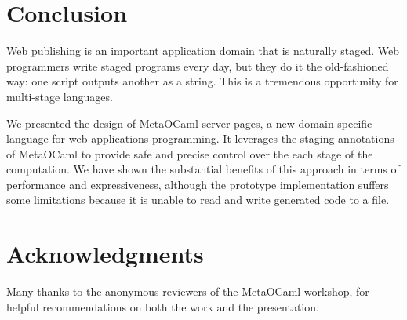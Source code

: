 \documentclass[preprint]{acm_proc_article-sp}
\def\MOC{MetaOCaml\xspace}
\begin{document}
\section{Conclusion}
\label{sec:concl}

Web publishing is an important application domain that is
naturally staged.  Web programmers write staged programs every
day, but they do it the old-fashioned way: one script outputs
another as a string.  This is a tremendous opportunity for
multi-stage languages.

We presented the design of \MOC server pages, a new
domain-specific language for web applications programming.  It
leverages the staging annotations of \MOC to provide safe and
precise control over the each stage of the computation.
We have shown the substantial benefits of this approach in terms
of performance and expressiveness, although the prototype
implementation suffers some limitations because it is unable to
read and write generated code to a file.

\section*{Acknowledgments}

Many thanks to the anonymous reviewers of the \MOC workshop, for
helpful recommendations on both the work and the presentation.


\raggedright

\end{document}
